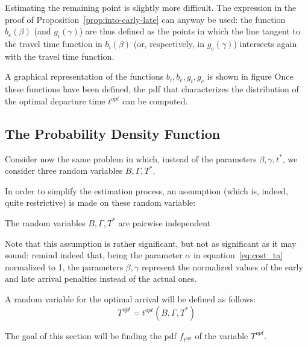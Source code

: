 Estimating the remaining point is slightly more difficult.
The expression in the proof of Proposition~\ref{prop:into-early-late} can anyway be used:
the function \(b_e(\beta)\) (and \(g_i(\gamma)\))
are thus defined as the points in which the line tangent to the travel time function in \(b_i(\beta)\) (or, respectively, in \(g_e(\gamma)\)) intersects again with the travel time function.

A graphical representation of the functions \(b_i, b_e, g_i, g_e\) is shown in figure
Once these functions have been defined,
the pdf that characterizes the distribution of the optimal departure time \(t^{opt}\) can be computed.

\subsection{The Probability Density Function}

Consider now the same problem in which,
instead of the parameters \(\beta, \gamma, t^*\),
we consider three random variables \(B, \Gamma, T^*\).

In order to simplify the estimation process, an assumption (which is, indeed, quite restrictive)
is made on these random variable:

\begin{assumption}
  The random variables \(B, \Gamma, T^*\) are pairwise independent
\end{assumption}

Note that this assumption is rather significant,
but not as significant as it may sound:
remind indeed that, being the parameter \(\alpha\) in equation~\eqref{eq:cost_ta} normalized to 1,
the parameters \(\beta, \gamma\) represent the normalized values of the early and late arrival penalties instead of the actual ones.

A random variable for the optimal arrival will be defined as follows:
\begin{equation}
  \label{eq:rv-opt-arr}
  T^{opt} = t^{opt}(B, \Gamma, T^*)
\end{equation}

The goal of this section will be finding the pdf \(f_{t^{opt}}\) of the variable \(T^{opt}\).


